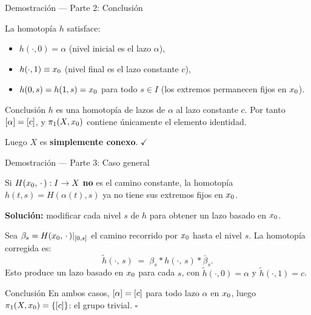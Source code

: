 \begin{frame}{Demostración — Parte 2: Conclusión}

  La homotopía $h$ satisface:
  \begin{itemize}
    \item $h(\cdot, 0) = \alpha$ \quad (nivel inicial es el lazo $\alpha$),
    \item $h(\cdot, 1) \equiv x_0$ \quad (nivel final es el lazo constante $c$),
    \item $h(0, s) = h(1, s) = x_0$ para todo $s \in I$
          \quad (los extremos permanecen fijos en $x_0$).
  \end{itemize}

  \bigskip
  \begin{block}{Conclusión}
    $h$ es una homotopía de lazos de $\alpha$ al lazo constante $c$.
    Por tanto $[\alpha] = [c]$, y $\pi_1(X, x_0)$ contiene
    únicamente el elemento identidad.

    \medskip
    Luego $X$ es \textbf{simplemente conexo}. \hfill $\checkmark$
  \end{block}

\end{frame}

\begin{frame}{Demostración — Parte 3: Caso general}

  Si $H(x_0,\,\cdot\,) : I \to X$ \textbf{no} es el camino constante,
  la homotopía $h(t,s) = H(\alpha(t),s)$ ya no tiene sus extremos fijos
  en $x_0$.

  \medskip
  \textbf{Solución:} modificar cada nivel $s$ de $h$ para obtener
  un lazo basado en $x_0$.

  \medskip
  Sea $\beta_s = H(x_0,\,\cdot\,)|_{[0,s]}$ el camino recorrido por
  $x_0$ hasta el nivel $s$.  La homotopía corregida es:
  \[
    \boxed{\tilde{h}(\cdot,\, s) \;=\; \beta_s * h(\cdot,\, s) * \bar{\beta}_s.}
  \]
  Esto produce un lazo basado en $x_0$ para cada $s$, con
  $\tilde{h}(\cdot,0) = \alpha$ y $\tilde{h}(\cdot,1) = c$.

  \bigskip
  \begin{block}{Conclusión}
    En ambos casos, $[\alpha] = [c]$ para todo lazo $\alpha$
    en $x_0$, luego $\pi_1(X,x_0) = \{[c]\}$: el grupo trivial.
    \hfill $\square$
  \end{block}

\end{frame}

